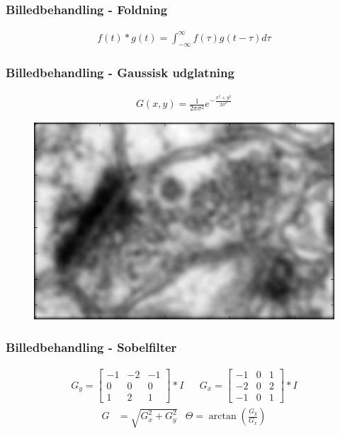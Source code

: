 \documentclass[12pt,t]{beamer}
\begin{document}
\begin{frame}
\frametitle{Billedbehandling - Foldning}
\begin{align*}
	f(t)*g(t)=\int_{-\infty}^{\infty}f(\tau)g(t-\tau)d\tau
\end{align*}

\end{frame}

\begin{frame}
\frametitle{Billedbehandling - Gaussisk udglatning}
\begin{align*}
	G(x,y) = \frac{1}{2\pi\sigma^2}e^{-\frac{x^2+y^2}{2\sigma^2}}\label{ali:premethod_gaussG}
\end{align*}

\begin{figure}[H]
	\centering
	\includegraphics[scale=0.5]{../files/premethod/img/gausscell.png}
\end{figure}
\end{frame}

\begin{frame}
\frametitle{Billedbehandling - Sobelfilter}
\begin{align*}
	G_y = \begin{bmatrix}
		-1 & -2 & -1\\
		0 & 0 & 0\\
		1 & 2 & 1
	\end{bmatrix} * I
	&&
	G_x = \begin{bmatrix}
		-1 & 0 & 1\\
		-2 & 0 & 2\\
		-1 & 0 & 1
	\end{bmatrix} * I
	\end{align*}
\begin{align*}
	G &= \sqrt{G_x^2 + G_y^2}
	&\Theta = \arctan\left(\frac{G_y}{G_x}\right)
\end{align*}
\end{frame}
\end{document}
